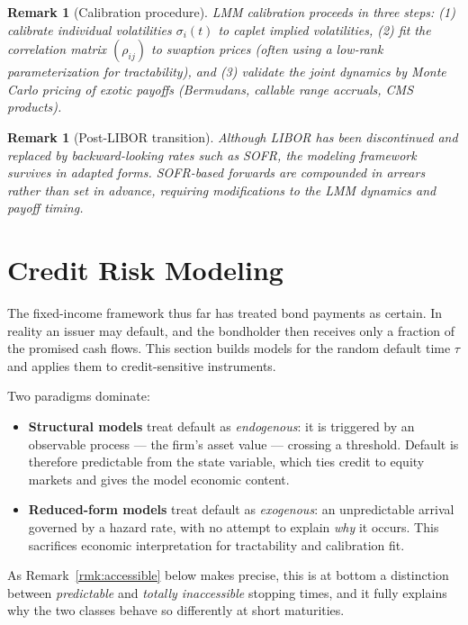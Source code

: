 \documentclass{report}
\theoremstyle{spacedplain}
\theoremstyle{spaceddefinition}
\theoremstyle{spacedremark}
\newtheorem{remark}[theorem]{Remark}
\begin{document}
\begin{remark}[Calibration procedure]
LMM calibration proceeds in three steps: (1) calibrate individual volatilities $\sigma_i(t)$ to caplet implied volatilities, (2) fit the correlation matrix $(\rho_{ij})$ to swaption prices (often using a low-rank parameterization for tractability), and (3) validate the joint dynamics by Monte Carlo pricing of exotic payoffs (Bermudans, callable range accruals, CMS products).
\end{remark}

\begin{remark}[Post-LIBOR transition]
Although LIBOR has been discontinued and replaced by backward-looking rates such as SOFR, the modeling framework survives in adapted forms. SOFR-based forwards are compounded in arrears rather than set in advance, requiring modifications to the LMM dynamics and payoff timing.
\end{remark}


\section{Credit Risk Modeling}

The fixed-income framework thus far has treated bond payments as certain. In reality an issuer may default, and the bondholder then receives only a fraction of the promised cash flows. This section builds models for the random default time $\tau$ and applies them to credit-sensitive instruments.

Two paradigms dominate:

\begin{itemize}[noitemsep]
    \item \textbf{Structural models} treat default as \emph{endogenous}: it is triggered by an observable process --- the firm's asset value --- crossing a threshold. Default is therefore predictable from the state variable, which ties credit to equity markets and gives the model economic content.
    \item \textbf{Reduced-form models} treat default as \emph{exogenous}: an unpredictable arrival governed by a hazard rate, with no attempt to explain \emph{why} it occurs. This sacrifices economic interpretation for tractability and calibration fit.
\end{itemize}

As Remark~\ref{rmk:accessible} below makes precise, this is at bottom a distinction between \emph{predictable} and \emph{totally inaccessible} stopping times, and it fully explains why the two classes behave so differently at short maturities.
\end{document}

